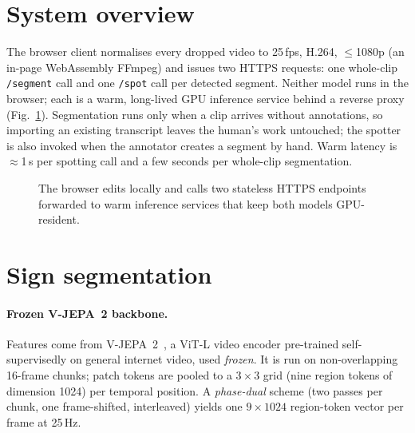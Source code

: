 \documentclass[10pt,twocolumn]{article}
\newcommand{\code}[1]{\texttt{\small #1}}
\begin{document}
\section{System overview}
The browser client normalises every dropped video to 25\,fps, H.264, $\leq$1080p (an in-page
WebAssembly FFmpeg) and issues two HTTPS requests: one whole-clip \code{/segment} call and one
\code{/spot} call per detected segment. Neither model runs in the browser; each is a warm,
long-lived GPU inference service behind a reverse proxy (Fig.~\ref{fig:arch}). Segmentation runs
only when a clip arrives without annotations, so importing an existing transcript leaves the
human's work untouched; the spotter is also invoked when the annotator creates a segment by hand.
Warm latency is $\approx$1\,s per spotting call and a few seconds per whole-clip segmentation.

\begin{figure}[t]\centering
{}
\caption{The browser edits locally and calls two stateless HTTPS endpoints forwarded to warm
inference services that keep both models GPU-resident.}
\label{fig:arch}
\end{figure}

\section{Sign segmentation}
\paragraph{Frozen V-JEPA~2 backbone.}
Features come from V-JEPA~2~\cite{vjepa2}, a ViT-L video encoder pre-trained self-supervisedly on
general internet video, used \emph{frozen}. It is run on non-overlapping 16-frame chunks; patch
tokens are pooled to a $3\times3$ grid (nine region tokens of dimension 1024) per temporal
position. A \emph{phase-dual} scheme (two passes per chunk, one frame-shifted, interleaved) yields
one $9\times1024$ region-token vector per frame at 25\,Hz.
\end{document}

